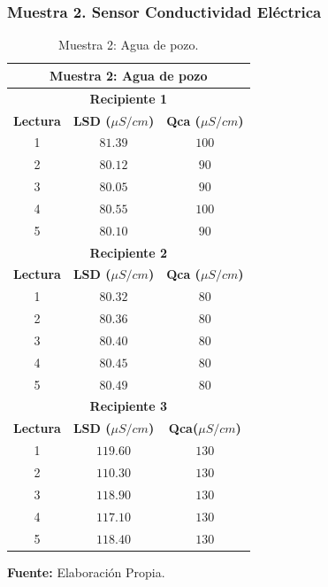 \subsubsection{Muestra 2. Sensor Conductividad El\'ectrica }
    \begin{table}[H]
        \protect\caption[Muestra 2: Agua de pozo ]{Muestra 2: Agua de pozo.}
        \label{tab:CEMuestra2}
        \centering
        \begin{tabular}{|c|c|c|}
            \hline
            \multicolumn{3}{|c|}{\textbf{Muestra 2: Agua de pozo}} \\
             \hline
            \multicolumn{3}{|c|}{\textbf{Recipiente 1}} \\
            \hline
            \textbf{Lectura}&\textbf{LSD ($\mu S/cm$)}&\textbf{Qca ($\mu S/cm$)} \\
            \hline
            {1}& $81.39$&$100$ \\ 
            \hline
            {2}& $80.12$&$90$ \\ 
            \hline
             {3}&$80.05$&$90$\\  
            \hline
            {4}& $80.55$&$100$\\ 
            \hline
            {5}& $80.10$&$90$ \\
            \hline
                       \multicolumn{3}{|c|}{\textbf{Recipiente 2}} \\
            \hline
            \textbf{Lectura}&\textbf{LSD ($\mu S/cm$)}&\textbf{Qca ($\mu S/cm$)} \\
            \hline
            {1}& $80.32$&$80$ \\ 
            \hline
            {2}& $80.36$&$80$ \\ 
            \hline
             {3}&$80.40$&$80$\\  
            \hline
            {4}& $80.45$&$80$\\ 
            \hline
            {5}& $80.49$&$80$ \\ 
            \hline
            \multicolumn{3}{|c|}{\textbf{Recipiente 3}} \\
            \hline
            \textbf{Lectura}&\textbf{LSD ($\mu S/cm$)}&\textbf{Qca($\mu S/cm$)} \\
            \hline
            {1}& $119.60$&$130$ \\ 
            \hline
            {2}& $110.30$&$130$ \\ 
            \hline
             {3}&$118.90$&$130$\\  
            \hline
            {4}& $117.10$&$130$\\ 
            \hline
            {5}& $118.40$&$130$ \\ 
            \hline
        \end{tabular}
        \vspace{5mm}
        \newline
        \hfill \textbf{Fuente: }Elaboración Propia.
    \end{table}

